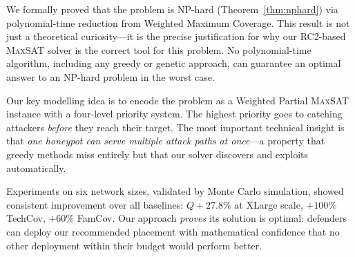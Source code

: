 \documentclass[journal]{IEEEtran}
\newcommand{\maxsat}{\textsc{MaxSAT}}
\begin{document}
We formally proved that the problem is NP-hard
(Theorem~\ref{thm:nphard}) via polynomial-time reduction
from Weighted Maximum Coverage.
This result is not just a theoretical curiosity---it is the
precise justification for why our RC2-based \maxsat{}
solver is the correct tool for this problem.
No polynomial-time algorithm, including any greedy or
genetic approach, can guarantee an optimal answer to an
NP-hard problem in the worst case.

Our key modelling idea is to encode the problem as a Weighted
Partial \maxsat{} instance with a four-level priority system.
The highest priority goes to catching attackers \emph{before}
they reach their target.
The most important technical insight is that \emph{one
honeypot can serve multiple attack paths at once}---a
property that greedy methods miss entirely but that our
solver discovers and exploits automatically.

Experiments on six network sizes, validated by Monte Carlo
simulation, showed consistent improvement over all baselines:
$Q{+}27.8\%$ at XLarge scale, $+100\%$ TechCov, $+60\%$
FamCov.
Our approach \emph{proves} its solution is optimal:
defenders can deploy our recommended placement with
mathematical confidence that no other deployment within
their budget would perform better.
\end{document}
